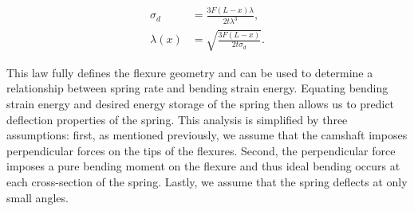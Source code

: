 \documentclass[letterpaper, 10 pt, conference]{ieeeconf} %
\begin{document}
\begin{align}
    \sigma_d &= \frac{3F(L-x)\lambda}{2t\lambda^3}, \\
    \lambda(x) &= \sqrt{\frac{3F(L-x)}{2t\sigma_d}}.
    \label{eqn:flexure_width}
\end{align}

This law fully defines the flexure geometry and can be used to determine a relationship between spring rate and bending strain energy. Equating bending strain energy and desired energy storage of the spring then allows us to predict deflection properties of the spring. This analysis is simplified by three assumptions: first, as mentioned previously, we assume that the camshaft imposes perpendicular forces on the tips of the flexures. Second, the perpendicular force imposes a pure bending moment on the flexure and thus ideal bending occurs at each cross-section of the spring. Lastly, we assume that the spring deflects at only small angles.
\end{document}
